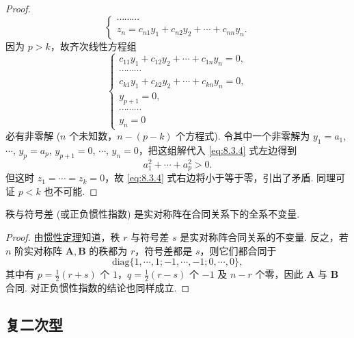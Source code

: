 \documentclass[../../main.tex]{subfiles}
\begin{document}
\begin{proof}
\[\begin{cases}
\cdots\cdots\cdots\\
z_n = c_{n1}y_1 + c_{n2}y_2 + \cdots + c_{nn}y_n.
\end{cases}
\]
因为 $p>k$，故齐次线性方程组
\[
\begin{cases}
c_{11}y_1 + c_{12}y_2 + \cdots + c_{1n}y_n = 0,\\
\cdots\cdots\cdots\\
c_{k1}y_1 + c_{k2}y_2 + \cdots + c_{kn}y_n = 0,\\
y_{p + 1} = 0,\\
\cdots\cdots\cdots\\
y_n = 0
\end{cases}
\]
必有非零解 ($n$ 个未知数，$n - (p - k)$ 个方程式). 令其中一个非零解为 $y_1 = a_1$, $\cdots$, $y_p = a_p$, $y_{p + 1} = 0$, $\cdots$, $y_n = 0$，把这组解代入 \eqref{eq:8.3.4} 式左边得到
\[
a_1^2+\cdots + a_p^2>0.
\]
但这时 $z_1 = \cdots = z_k = 0$，故 \eqref{eq:8.3.4} 式右边将小于等于零，引出了矛盾. 同理可证 $p<k$ 也不可能.

\end{proof}

\begin{theorem}\label{theorem:秩与符号差(或正负惯性指数)都是实对称阵在合同关系下的全系不变量}
秩与符号差 (或正负惯性指数) 是实对称阵在合同关系下的全系不变量.
\end{theorem}
\begin{proof}
由\hyperref[theorem:惯性定理]{惯性定理}知道，秩 $r$ 与符号差 $s$ 是实对称阵合同关系的不变量. 反之，若 $n$ 阶实对称阵 $\boldsymbol{A},\boldsymbol{B}$ 的秩都为 $r$，符号差都是 $s$，则它们都合同于
\[
\mathrm{diag}\{1,\cdots,1;-1,\cdots,-1;0,\cdots,0\},
\]
其中有 $p = \frac{1}{2}(r + s)$ 个 $1$，$q = \frac{1}{2}(r - s)$ 个 $-1$ 及 $n - r$ 个零，因此 $\boldsymbol{A}$ 与 $\boldsymbol{B}$ 合同. 对正负惯性指数的结论也同样成立. 

\end{proof}


\subsection{复二次型}
\end{document}
